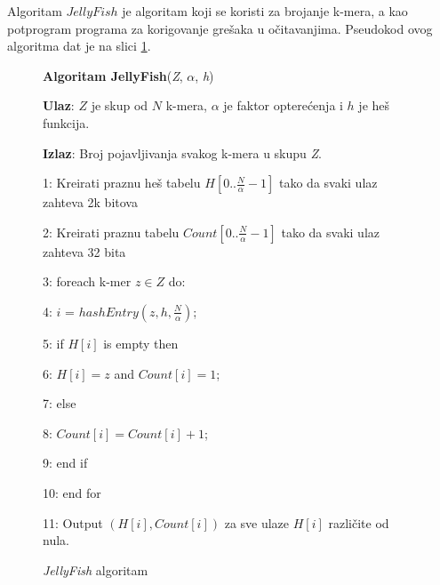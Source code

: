 \documentclass[12pt,oneside]{memoir}
\begin{document}
Algoritam $JellyFish$ je algoritam koji se koristi za brojanje k-mera, a kao potprogram programa za korigovanje grešaka u očitavanjima. Pseudokod ovog algoritma dat je na slici \ref{box:jellyfish}.

\begin{comment}

\begin{figure}[!ht]
  \centering
  \texttt{[image: Jellyfish.PNG]}
  \caption{Algoritam Jellyfish \cite{WingKinSung}}
  \label{fig:jellyfish}
\end{figure}

\end{comment}

\begin{figure}[!ht]
\begin{tcolorbox}
\textbf{Algoritam JellyFish}(\textit{Z}, $\alpha$, \textit{h})

\textbf{Ulaz}: $Z$ je skup od $N$ k-mera, $\alpha$ je faktor opterećenja i $h$ je heš funkcija.

\textbf{Izlaz}: Broj pojavljivanja svakog k-mera u skupu \textit{Z}.

1: Kreirati praznu heš tabelu $H[0..\frac{N}{\alpha} - 1]$ tako da svaki ulaz zahteva 2k bitova

2: Kreirati praznu tabelu $Count[0..\frac{N}{\alpha} - 1]$ tako da svaki ulaz zahteva 32 bita 

3: foreach k-mer $z \in Z$ do:

4:\hspace{1cm} $i$ = $hashEntry(z, h, \frac{N}{\alpha})$;
    
5:\hspace{1cm} if $H[i]$ is empty then

6:\hspace{2cm} $H[i] = z$ and $Count[i] = 1$;

7:\hspace{1cm} else 

8:\hspace{2cm} $Count[i] = Count[i] + 1$;

9:\hspace{1cm} end if

10: end for

11: Output $(H[i], Count[i])$ za sve ulaze $H[i]$ različite od nula.
\end{tcolorbox}
\caption{\textit{JellyFish} algoritam \cite{WingKinSung}}
\label{box:jellyfish}
\end{figure}
\end{document}
